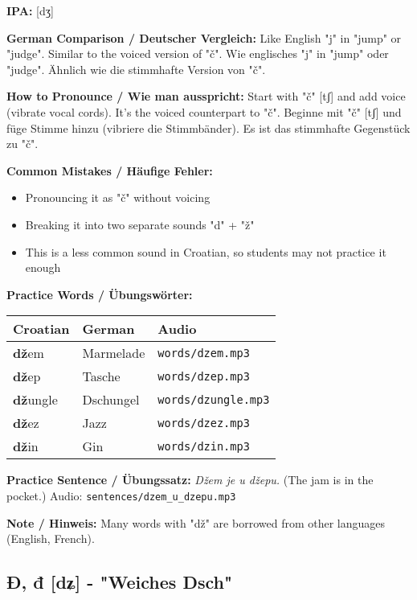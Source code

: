 \begin{tcolorbox}[colback=lightblue!30, colframe=croatianblue, title=\textbf{Dž, dž}]

\textbf{IPA:} [dʒ]

\textbf{German Comparison / Deutscher Vergleich:}
Like English "j" in "jump" or "judge". Similar to the voiced version of "č".
Wie englisches "j" in "jump" oder "judge". Ähnlich wie die stimmhafte Version von "č".

\textbf{How to Pronounce / Wie man ausspricht:}
Start with "č" [tʃ] and add voice (vibrate vocal cords). It's the voiced counterpart to "č".
Beginne mit "č" [tʃ] und füge Stimme hinzu (vibriere die Stimmbänder). Es ist das stimmhafte Gegenstück zu "č".

\textbf{Common Mistakes / Häufige Fehler:}
\begin{itemize}
    \item Pronouncing it as "č" without voicing
    \item Breaking it into two separate sounds "d" + "ž"
    \item This is a less common sound in Croatian, so students may not practice it enough
\end{itemize}

\textbf{Practice Words / Übungswörter:}
\begin{tabular}{lll}
\textbf{Croatian} & \textbf{German} & \textbf{Audio} \\
\midrule
\textbf{dž}em & Marmelade & \texttt{words/dzem.mp3} \\
\textbf{dž}ep & Tasche & \texttt{words/dzep.mp3} \\
\textbf{dž}ungle & Dschungel & \texttt{words/dzungle.mp3} \\
\textbf{dž}ez & Jazz & \texttt{words/dzez.mp3} \\
\textbf{dž}in & Gin & \texttt{words/dzin.mp3} \\
\end{tabular}

\textbf{Practice Sentence / Übungssatz:}
\textit{Džem je u džepu.}
(The jam is in the pocket.)
Audio: \texttt{sentences/dzem\_u\_dzepu.mp3}

\textbf{Note / Hinweis:}
Many words with "dž" are borrowed from other languages (English, French).

\end{tcolorbox}

\subsection{Đ, đ [dʑ] - "Weiches Dsch"}

